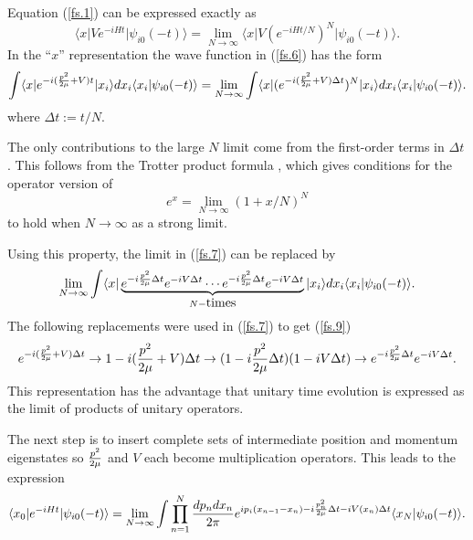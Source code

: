 \documentclass[aps,prc,reprint,noshowpacs,groupedaddress,onecolumn]{revtex4}
\def\beq{\begin{equation}}
\def\eeq{\end{equation}}
\begin{document}

Equation (\ref{fs.1}) can be expressed exactly as
\beq
\langle x \vert
V e^{-iHt} \vert 
\psi_{i0} (-t) \rangle =
\lim_{N \to \infty} 
\langle x \vert V
\left (e^{-iH{t/N}}\right )^N  \vert
\psi_{i0} (-t) \rangle . 
\label{fs.6}
\eeq
In the ``$x$'' representation
the wave function in (\ref{fs.6}) has the form
\beq
\int \langle x \vert e^{-i ({p^2 \over 2\mu} + V) t} \vert x_i \rangle
dx_i \langle x_i \vert \psi_{i0} (-t)\rangle  = 
\lim_{N\to \infty}
\int \langle x \vert (e^{-i ({p^2 \over 2\mu} + V)\Delta t})^N \vert x_i
\rangle dx_i \langle x_i \vert \psi_{i0} (-t)\rangle . 
\label{fs.7}
\eeq
where $\Delta t := t/N$. 

The only contributions to the large $N$ limit come from the
first-order terms in $\Delta t$.  This follows from the Trotter
product formula \cite{Simon}, which gives conditions for the operator
version of
\beq
e^x = \lim_{N \to \infty}(1+{x/N})^N 
\label{fs.8}
\eeq
to hold when $N\to \infty$ as a strong limit.

Using this property, the limit in (\ref{fs.7}) can be replaced by
\beq
\lim_{N\to \infty}
\int \langle x \vert 
\underbrace{e^{-i {p^2 \over 2\mu}\Delta t}
e^{-i V \Delta t}
\cdots 
e^{-i {p^2 \over 2\mu}\Delta t}
e^{-i V \Delta t}}_{N-\mbox{times}}
\vert x_i 
\rangle   dx_i \langle x_i \vert \psi_{i0} (-t)\rangle .
\label{fs.9}
\eeq
The following replacements were used in (\ref{fs.7}) 
to get (\ref{fs.9})
\beq
e^{-i ({p^2 \over 2\mu} + V)\Delta t} \to
1 -i ({p^2 \over 2\mu} + V)\Delta t  \to
(1 -i {p^2 \over 2\mu}\Delta t )(1-i V \Delta t )\to
e^{-i {p^2 \over 2\mu}\Delta t}
e^{-i V\Delta t} .
\label{fs.10}
\eeq
This representation has the advantage that unitary time evolution
is expressed as the limit of products of unitary operators.

The next step is to insert complete sets of intermediate position 
and momentum eigenstates
so ${p^2 \over 2\mu}$ and $V$ each become multiplication operators.  This 
leads to the expression 
\beq
\langle x_0 \vert
e^{-iHt} \vert
\psi_{i0} (-t) \rangle =
\lim_{N\to \infty}
\int \prod_{n=1}^N {dp_n dx_n \over 2\pi} 
e^{ i p_i (x_{n-1}-x_n) - i {p_n^2 \over 2\mu}\Delta t -i 
V(x_n) \Delta t} \langle x_N \vert \psi_{i0} (-t)\rangle .
\label{fs.11}
\eeq
\end{document}
